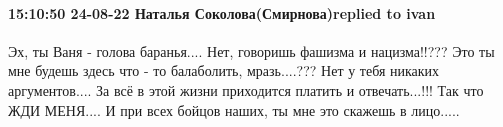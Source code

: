  
 
 
 
 

\paragraph{15:10:50 24-08-22 Наталья Соколова(Смирнова)replied to ivan}

Эх, ты Ваня - голова баранья.... Нет, говоришь фашизма и нацизма!!??? Это ты
мне будешь здесь что - то балаболить, мразь....??? Нет у тебя никаких
аргументов.... За всё в этой жизни приходится платить и отвечать...!!! Так что
ЖДИ МЕНЯ.... И при всех бойцов наших, ты мне это скажешь в лицо.....
